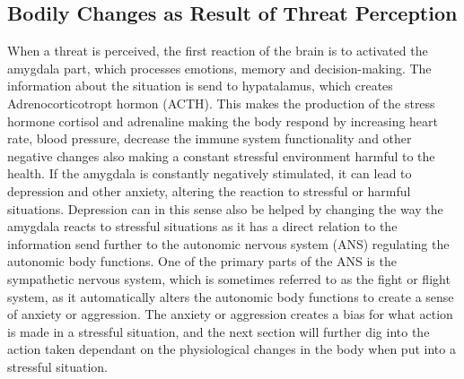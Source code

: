 \subsection{Bodily Changes as Result of Threat Perception}
When a threat is perceived, the first reaction of the brain is to activated the amygdala part, which processes emotions, memory and decision-making. The information about the situation is send to hypatalamus, which creates Adrenocorticotropt hormon (ACTH). This makes the production of the stress hormone cortisol and adrenaline making the body respond by increasing heart rate, blood pressure, decrease the immune system functionality and other negative changes also making a constant stressful environment harmful to the health. If the amygdala is constantly negatively stimulated, it can lead to depression and other anxiety, altering the reaction to stressful or harmful situations. Depression can in this sense also be helped by changing the way the amygdala reacts to stressful situations as it has a direct relation to the information send further to the autonomic nervous system (ANS) regulating the autonomic body functions. One of the primary parts of the ANS is the sympathetic nervous system, which is sometimes referred to as the fight or flight system, as it automatically alters the autonomic body functions to create a sense of anxiety or aggression. The anxiety or aggression creates a bias for what action is made in a stressful situation, and the next section will further dig into the action taken dependant on the physiological changes in the body when put into a stressful situation.\cite{human_physiology} \cite{perspective_anxiety} \cite{CNS}
